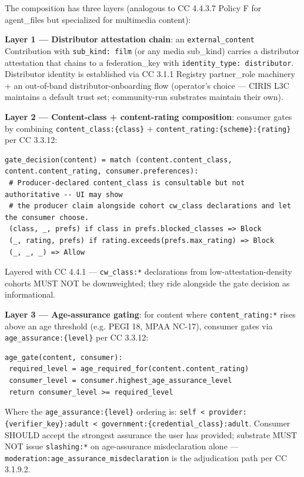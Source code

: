 \documentclass[11pt]{article}
\begin{document}
The composition has three layers (analogous to CC 4.4.3.7 Policy F for agent\_files but specialized for multimedia content):


\textbf{Layer 1 — Distributor attestation chain}: an \texttt{external\_content} Contribution with \texttt{sub\_kind: film} (or any media sub\_kind) carries a distributor attestation that chains to a federation\_key with \texttt{identity\_type: distributor}. Distributor identity is established via CC 3.1.1 Registry partner\_role machinery + an out-of-band distributor-onboarding flow (operator's choice — CIRIS L3C maintains a default trust set; community-run substrates maintain their own).


\textbf{Layer 2 — Content-class + content-rating composition}: consumer gates by combining \texttt{content\_class:\{class\}} + \texttt{content\_rating:\{scheme\}:\{rating\}} per CC 3.3.12:


\begin{lstlisting}
gate_decision(content) = match (content.content_class, content.content_rating, consumer.preferences):
 # Producer-declared content_class is consultable but not authoritative -- UI may show
 # the producer claim alongside cohort cw_class declarations and let the consumer choose.
 (class, _, prefs) if class in prefs.blocked_classes => Block
 (_, rating, prefs) if rating.exceeds(prefs.max_rating) => Block
 (_, _, _) => Allow
\end{lstlisting}

Layered with CC 4.4.1 — \texttt{cw\_class:*} declarations from low-attestation-density cohorts MUST NOT be downweighted; they ride alongside the gate decision as informational.


\textbf{Layer 3 — Age-assurance gating}: for content where \texttt{content\_rating:*} rises above an age threshold (e.g. PEGI 18, MPAA NC-17), consumer gates via \texttt{age\_assurance:\{level\}} per CC 3.3.12:


\begin{lstlisting}
age_gate(content, consumer):
 required_level = age_required_for(content.content_rating)
 consumer_level = consumer.highest_age_assurance_level
 return consumer_level >= required_level
\end{lstlisting}

Where the \texttt{age\_assurance:\{level\}} ordering is: \texttt{self < provider:\{verifier\_key\}:adult < government:\{credential\_class\}:adult}. Consumer SHOULD accept the strongest assurance the user has provided; substrate MUST NOT issue \texttt{slashing:*} on age-assurance misdeclaration alone — \texttt{moderation:age\_assurance\_misdeclaration} is the adjudication path per CC 3.1.9.2.
\end{document}
